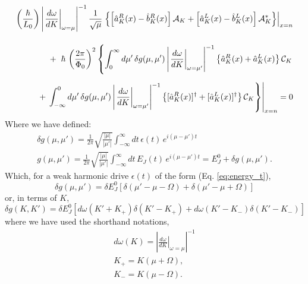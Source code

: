 %
\begin{equation}\label{eq:BC_harmonic_drive}
\begin{split}
    \left(\frac{\hbar}{L_0}\right)
    \left|\left.\frac{d\omega}{dK}\right|_{\omega=\mu}\right|^{-1}
    \frac{1}{\sqrt{\mu}}
    \left.
    \left\lbrace
    \left[\hat{a}^R_K(x) - \hat{b}_K^R(x)\right]
    \mathcal{A}_K +
    \left[\hat{a}^L_K(x) - \hat{b}^L_K(x)\right]
    \mathcal{A}^*_K
    \right\rbrace
    \right|_{x=n}
    \\[4mm]
    +\hspace{2mm}
    \hbar \, \left(\frac{2\pi}{\Phi_0}\right)^2
    \left\lbrace
    \int_{0}^{\infty} d \mu'\,
    \delta g(\mu, \mu')
    \left|\left.\frac{d\omega}{dK}\right|_{\omega=\mu'}\right|^{-1}
    \left\lbrace
    \hat{a}^R_K(x) + \hat{a}_K^L(x)
    \right\rbrace
    \mathcal{C}_K\right.
    \\[2mm]
    +
    \left.
    \left.
    \int_{-\infty}^{0} d \mu'\,
    \delta g(\mu, \mu')
    \left|\left.\frac{d\omega}{dK}\right|_{\omega=\mu'}\right|^{-1}
    \left\lbrace
    [\hat{a}^R_K(x)]^\dagger + [\hat{a}_K^L(x)]^\dagger
    \right\rbrace
    \mathcal{C}_K
    \right\rbrace
    \right|_{x=n}
    = 0
\end{split}
\end{equation}
%
Where we have defined:
\begin{gather}\label{eq:Energy_FT}
    \delta g(\mu, \mu') = \frac{1}{2 \pi} \sqrt{\frac{|\mu|}{|\mu'|}}
    \int_{-\infty}^{\infty} dt \, \epsilon(t) \, e^{i(\mu - \mu')t}
    \\
    g(\mu, \mu') = \frac{1}{2 \pi} \sqrt{\frac{|\mu|}{|\mu'|}}
    \int_{-\infty}^{\infty} dt \, E_J(t) \, e^{i(\mu - \mu')t}
    = E_J^0 + \delta g(\mu, \mu').
\end{gather}
%
Which, for a weak harmonic drive $\epsilon(t)$ of the form (Eq. \ref{eq:energy_t}),
%
\begin{equation}
    \delta g(\mu, \mu') = \delta E_J^0
    \left[
    \delta (\mu' - \mu - \Omega) +
    \delta(\mu' - \mu + \Omega)
    \right]
\end{equation}
%
or, in terms of $K$,
\begin{equation}
    \delta g(K,K')= \delta E^0_J
    \left[ 
    d\omega (K'+K_+) \delta (K' - K_+)
    + d\omega (K'-K_-) \delta(K' - K_-)
    \right]
\end{equation}
% 
where we have used the shorthand notations,
%
\begin{gather}
    d\omega (K) =     \left|\left.\frac{d\omega}{dK}\right|_{\omega=\mu}\right|^{-1} 
    \label{eq:shorthand_dw}
    \\
    K_+ = K(\mu + \Omega),\\
    K_- = K(\mu - \Omega).
\end{gather}
